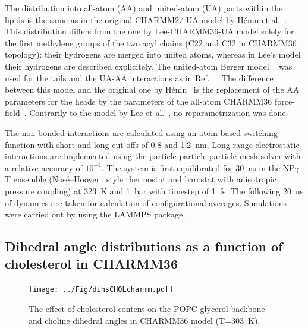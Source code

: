 \documentclass[journal=jacsat,manuscript=article]{achemso}
\begin{document}
The distribution into all-atom  (AA) and united-atom (UA) parts within the lipids is the same
as in the original CHARMM27-UA model by H\'enin et al.~\cite{henin08}.  
This distribution differs from the one by Lee-CHARMM36-UA model solely
for the first methylene groups of the two acyl chains (C22 and C32 in CHARMM36 topology): 
their hydrogens are merged into  united atoms, whereas in Lee's model their hydrogens are described explicitely.
The  united-atom Berger model ~\cite{berger97} was used for the tails and the UA-AA interactions as in Ref. ~. 
The difference between this model and the original one by H\'enin~\cite{henin08} is the replacement of the 
AA parameters for the heads by  the parameters of the all-atom
 CHARMM36 force-field~\cite{klauda10}. Contrarily to the model by Lee et al.~\cite{lee14}, no reparametrization was done.

The non-bonded interactions are calculated using an atom-based switching function with short and long cut-offs of 0.8 and 1.2~nm. 
Long range electrostatic interactions are implemented using the particle-particle particle-mesh solver with a relative accuracy of $10^{-4}$. The system 
is first equilibrated for 30~ns in the NP$\gamma$T ensemble (Nos\'{e}--Hoover~\cite{nose84,hoover85} style thermostat and barostat with anisotropic pressure coupling) 
at 323~K and 1~bar with timestep of 1~fs. The following 20~ns of dynamics are taken for calculation of configurational averages. 
Simulations were carried out by using the LAMMPS package~\cite{plimpton95}. %

\subsection{Dihedral angle distributions as a function of cholesterol in CHARMM36}
\begin{figure}[]
  \centering
  \texttt{[image: ../Fig/dihsCHOLcharmm.pdf]}
  \caption{\label{dihsCHOLcharmm}
    The effect of cholesterol content on the POPC glycerol backbone and choline dihedral angles in CHARMM36 model (T=303~K).}
\end{figure}
\end{document}
